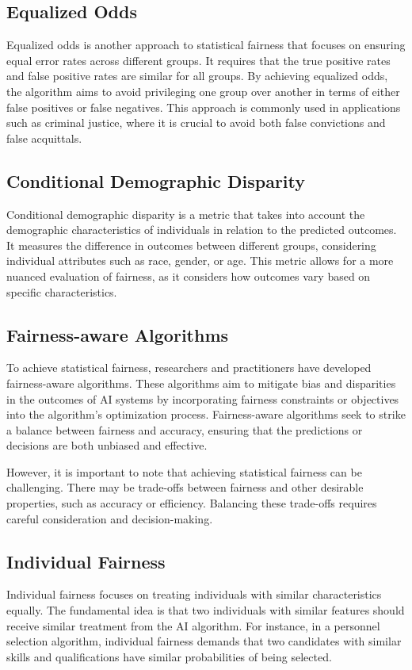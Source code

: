 \documentclass[12pt,a4paper,openright,twoside]{book}
\begin{document}
\subsection{Equalized Odds}

Equalized odds is another approach to statistical fairness that focuses on ensuring equal error rates across different groups. It requires that the true positive rates and false positive rates are similar for all groups. By achieving equalized odds, the algorithm aims to avoid privileging one group over another in terms of either false positives or false negatives. This approach is commonly used in applications such as criminal justice, where it is crucial to avoid both false convictions and false acquittals.

\subsection{Conditional Demographic Disparity}

Conditional demographic disparity is a metric that takes into account the demographic characteristics of individuals in relation to the predicted outcomes. It measures the difference in outcomes between different groups, considering individual attributes such as race, gender, or age. This metric allows for a more nuanced evaluation of fairness, as it considers how outcomes vary based on specific characteristics.

\subsection{Fairness-aware Algorithms}

To achieve statistical fairness, researchers and practitioners have developed fairness-aware algorithms. These algorithms aim to mitigate bias and disparities in the outcomes of AI systems by incorporating fairness constraints or objectives into the algorithm's optimization process. Fairness-aware algorithms seek to strike a balance between fairness and accuracy, ensuring that the predictions or decisions are both unbiased and effective.

However, it is important to note that achieving statistical fairness can be challenging. There may be trade-offs between fairness and other desirable properties, such as accuracy or efficiency. Balancing these trade-offs requires careful consideration and decision-making.

\subsection{Individual Fairness}
Individual fairness focuses on treating individuals with similar characteristics equally. The fundamental idea is that two individuals with similar features should receive similar treatment from the AI algorithm. For instance, in a personnel selection algorithm, individual fairness demands that two candidates with similar skills and qualifications have similar probabilities of being selected.
\end{document}
